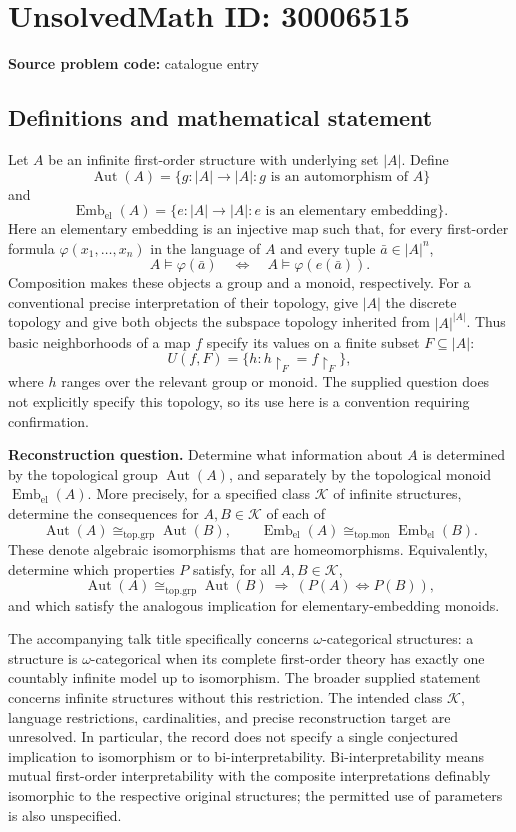\documentclass[11pt]{article}
\begin{document}
\section*{UnsolvedMath ID: 30006515}
\textbf{Source problem code:} catalogue entry
\subsection{Definitions and mathematical statement}
Let \(A\) be an infinite first-order structure with underlying set \(|A|\). Define
\[
\operatorname{Aut}(A)=\{g:|A|\to |A|:g\text{ is an automorphism of }A\}
\]
and
\[
\operatorname{Emb}_{\mathrm{el}}(A)=\{e:|A|\to |A|:e\text{ is an elementary embedding}\}.
\]
Here an elementary embedding is an injective map such that, for every first-order formula \(\varphi(x_1,\ldots,x_n)\) in the language of \(A\) and every tuple \(\bar a\in |A|^n\),
\[
A\models\varphi(\bar a)\quad\Longleftrightarrow\quad A\models\varphi(e(\bar a)).
\]
Composition makes these objects a group and a monoid, respectively. For a conventional precise interpretation of their topology, give \(|A|\) the discrete topology and give both objects the subspace topology inherited from \(|A|^{|A|}\). Thus basic neighborhoods of a map \(f\) specify its values on a finite subset \(F\subseteq |A|\):
\[
U(f,F)=\{h:h\!\upharpoonright_F=f\!\upharpoonright_F\},
\]
where \(h\) ranges over the relevant group or monoid. The supplied question does not explicitly specify this topology, so its use here is a convention requiring confirmation.

\textbf{Reconstruction question.} Determine what information about \(A\) is determined by the topological group \(\operatorname{Aut}(A)\), and separately by the topological monoid \(\operatorname{Emb}_{\mathrm{el}}(A)\). More precisely, for a specified class \(\mathcal K\) of infinite structures, determine the consequences for \(A,B\in\mathcal K\) of each of
\[
\operatorname{Aut}(A)\cong_{\mathrm{top.grp}}\operatorname{Aut}(B),
\qquad
\operatorname{Emb}_{\mathrm{el}}(A)\cong_{\mathrm{top.mon}}\operatorname{Emb}_{\mathrm{el}}(B).
\]
These denote algebraic isomorphisms that are homeomorphisms. Equivalently, determine which properties \(P\) satisfy, for all \(A,B\in\mathcal K\),
\[
\operatorname{Aut}(A)\cong_{\mathrm{top.grp}}\operatorname{Aut}(B)
\ \Longrightarrow\ (P(A)\Longleftrightarrow P(B)),
\]
and which satisfy the analogous implication for elementary-embedding monoids.

The accompanying talk title specifically concerns \(\omega\)-categorical structures: a structure is \(\omega\)-categorical when its complete first-order theory has exactly one countably infinite model up to isomorphism. The broader supplied statement concerns infinite structures without this restriction. The intended class \(\mathcal K\), language restrictions, cardinalities, and precise reconstruction target are unresolved. In particular, the record does not specify a single conjectured implication to isomorphism or to bi-interpretability. Bi-interpretability means mutual first-order interpretability with the composite interpretations definably isomorphic to the respective original structures; the permitted use of parameters is also unspecified.
\end{document}
